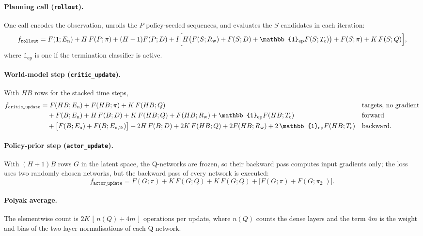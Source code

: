 \paragraph{Planning call (\texttt{rollout}).} One call encodes the observation, unrolls the $P$ policy-seeded sequences, and evaluates the $S$ candidates in each iteration:
\begingroup\small
\begin{equation}
  f_{\texttt{rollout}} = F(1;E_\mathrm{n}) + H\,F(P;\pi) + (H-1)F(P;D) + I\Bigl[H\bigl(F(S;R_\mathrm{w})+F(S;D)+\mathbb{1}_{\mathrm{ep}}F(S;T_\mathrm{c})\bigr)+F(S;\pi)+K\,F(S;Q)\Bigr] ,
  \label{eq:app-plan}
\end{equation}
\endgroup
where $\mathbb{1}_{\mathrm{ep}}$ is one if the termination classifier is active.

\paragraph{World-model step (\texttt{critic\_update}).} With $HB$ rows for the stacked time steps,
\begingroup\small
\begin{align}
  f_{\texttt{critic\_update}} &= F(HB;E_\mathrm{n}) + F(HB;\pi) + K\,F(HB;Q) && \text{targets, no gradient}\notag\\
  &\quad + F(B;E_\mathrm{n}) + H\,F(B;D) + K\,F(HB;Q) + F(HB;R_\mathrm{w}) + \mathbb{1}_{\mathrm{ep}}F(HB;T_\mathrm{c}) && \text{forward}\notag\\
  &\quad + \bigl[F(B;E_\mathrm{n})+F(B;E_{\mathrm{n},2:})\bigr] + 2H\,F(B;D) + 2K\,F(HB;Q) + 2F(HB;R_\mathrm{w}) + 2\,\mathbb{1}_{\mathrm{ep}}F(HB;T_\mathrm{c}) && \text{backward.}
  \label{eq:app-wm}
\end{align}
\endgroup

\paragraph{Policy-prior step (\texttt{actor\_update}).} With $(H+1)B$ rows $G$ in the latent space, the Q-networks are frozen, so their backward pass computes input gradients only; the loss uses two randomly chosen networks, but the backward pass of every network is executed:
\begingroup\small
\begin{equation}
  f_{\texttt{actor\_update}} = F(G;\pi) + K\,F(G;Q) + K\,F(G;Q) + \bigl[F(G;\pi)+F(G;\pi_{2:})\bigr] .
  \label{eq:app-prior}
\end{equation}
\endgroup

\paragraph{Polyak average.} The elementwise count is $2K\,[\,n(Q)+4m\,]$ operations per update, where $n(Q)$ counts the dense layers and the term $4m$ is the weight and bias of the two layer normalisations of each Q-network.

